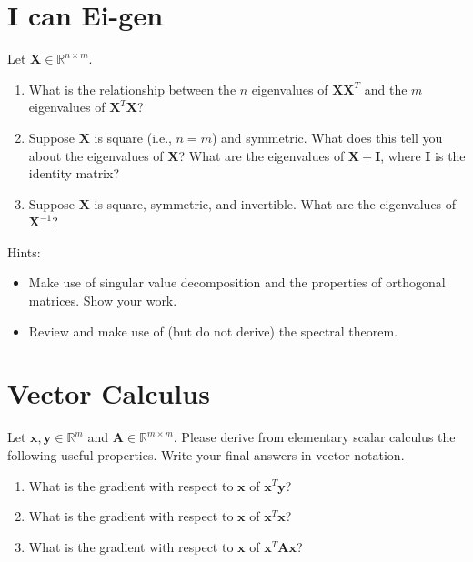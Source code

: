 \documentclass[submit]{harvardml}
\newcommand{\R}{\mathbb{R}}
\renewcommand{\v}[1]{\mathbf{#1}}
\begin{document}
\newpage
\section*{I can Ei-gen}
\begin{problem}
    Let $\v X \in \R^{n \times m}$.
    \begin{enumerate}[label=(\alph*)]
        \item What is the relationship between the $n$ eigenvalues
              of $\v X \v X^T$ and the $m$ eigenvalues of $\v X^T \v X$?
        \item Suppose $\v X$ is square (i.e., $n=m$) and symmetric.
              What does this tell you about the eigenvalues of $\v X$?
              What are the eigenvalues of $\v X + \v I$, where $\v I$ is the identity matrix?
        \item Suppose $\v X$ is square, symmetric, and invertible.
			  What are the eigenvalues of $\v X^{-1}$?
	\end{enumerate}
	Hints:
	\begin{itemize}
		\item Make use of singular value decomposition and the properties
			  of orthogonal matrices. Show your work.
		\item Review and make use of (but do not derive) the spectral theorem.
	\end{itemize}
\end{problem}


\newpage
\section*{Vector Calculus}
\begin{problem}
  Let $\v x, \v y \in \R^m$ and $\v A \in \R^{m \times m}$. Please derive from
  elementary scalar calculus the following useful properties. Write
  your final answers in vector notation.
\begin{enumerate}[label=(\alph*)]
    \item What is the gradient with respect to $\v x$ of $\v x^T \v y$?
    \item What is the gradient with respect to $\v x$ of $\v x^T \v x$?
    \item What is the gradient with respect to $\v x$ of $\v x^T \v A \v x$?
\end{enumerate}
\end{problem}
\end{document}
